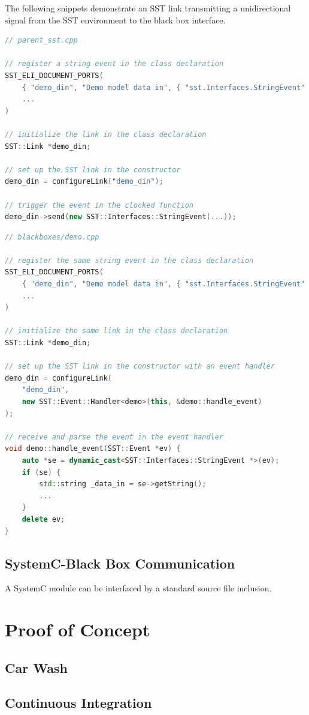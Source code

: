 \documentclass{article}
\begin{document}
    The following snippets demonstrate an SST link transmitting a unidirectional signal from the SST environment to the black box interface.

\begin{lstlisting}[language=C++]
// parent_sst.cpp

// register a string event in the class declaration
SST_ELI_DOCUMENT_PORTS(
    { "demo_din", "Demo model data in", { "sst.Interfaces.StringEvent" }},
    ...
)

// initialize the link in the class declaration
SST::Link *demo_din;

// set up the SST link in the constructor
demo_din = configureLink("demo_din");

// trigger the event in the clocked function
demo_din->send(new SST::Interfaces::StringEvent(...));
\end{lstlisting}

\begin{lstlisting}[language=C++]
// blackboxes/demo.cpp

// register the same string event in the class declaration
SST_ELI_DOCUMENT_PORTS(
    { "demo_din", "Demo model data in", { "sst.Interfaces.StringEvent" }},
    ...
)

// initialize the same link in the class declaration
SST::Link *demo_din;

// set up the SST link in the constructor with an event handler
demo_din = configureLink(
    "demo_din",
    new SST::Event::Handler<demo>(this, &demo::handle_event)
);

// receive and parse the event in the event handler
void demo::handle_event(SST::Event *ev) {
    auto *se = dynamic_cast<SST::Interfaces::StringEvent *>(ev);
    if (se) {
        std::string _data_in = se->getString();
        ...
    }
    delete ev;
}
\end{lstlisting}

    \subsection{SystemC-Black Box Communication}
    A SystemC module can be interfaced by a standard source file inclusion.

  \section{Proof of Concept}

    \subsection{Car Wash}

    \subsection{Continuous Integration}
\end{document}
